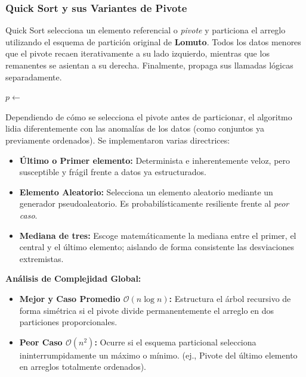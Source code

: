 \subsubsection{Quick Sort y sus Variantes de Pivote}\label{sec:quick_sort}
Quick Sort selecciona un elemento referencial o \textit{pivote} y particiona el arreglo utilizando el esquema de partición original de \textbf{Lomuto}. Todos los datos menores que el pivote recaen iterativamente a su lado izquierdo, mientras que los remanentes se asientan a su derecha. Finalmente, propaga sus llamadas lógicas separadamente.

\begin{algorithm}[H]
    \caption{Quick Sort Recursivo $\triangleright$ Basado en partición de Lomuto}
    \begin{algorithmic}[1]
            \State $p \gets$ 
            \State {}
            \State {}
        \EndIf
        \EndProcedure
    \end{algorithmic}
\end{algorithm}

Dependiendo de cómo se selecciona el pivote antes de particionar, el algoritmo lidia diferentemente con las anomalías de los datos (como conjuntos ya previamente ordenados). Se implementaron varias directrices:
\begin{itemize}
    \item \textbf{Último o Primer elemento:} Determinista e inherentemente veloz, pero susceptible y frágil frente a datos ya estructurados.
    \item \textbf{Elemento Aleatorio:} Selecciona un elemento aleatorio mediante un generador pseudoaleatorio. Es probabilísticamente resiliente frente al \textit{peor caso}.
    \item \textbf{Mediana de tres:} Escoge matemáticamente la mediana entre el primer, el central y el último elemento; aislando de forma consistente las desviaciones extremistas.
\end{itemize}

\textbf{Análisis de Complejidad Global:}
\begin{itemize}
    \item \textbf{Mejor y Caso Promedio $\mathcal{O}(n \log n)$:} Estructura el árbol recursivo de forma simétrica si el pivote divide permanentemente el arreglo en dos particiones proporcionales.
    \item \textbf{Peor Caso $\mathcal{O}(n^2)$:} Ocurre si el esquema particional selecciona ininterrumpidamente un máximo o mínimo. (ej., Pivote del último elemento en arreglos totalmente ordenados).
\end{itemize}


